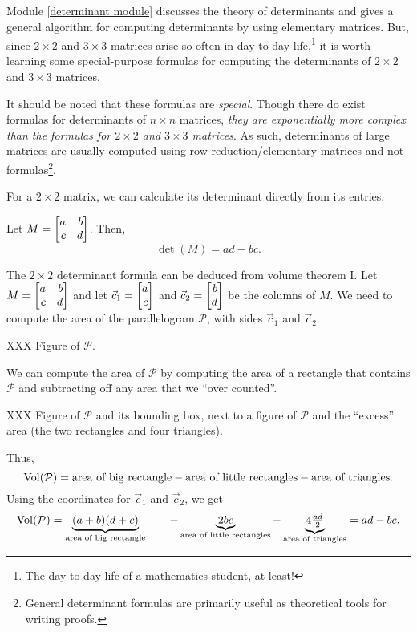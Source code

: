 Module \ref{determinant module} discusses the theory of determinants and gives a general algorithm
for computing determinants by using elementary matrices. But, since $2\times 2$ and $3\times 3$
matrices arise so often in day-to-day life,\footnote{ The day-to-day life of a mathematics student, at least!}
it is worth learning some special-purpose formulas for computing the determinants of $2\times 2$ and $3\times 3$
matrices.

It should be noted that these formulas are \emph{special}. Though there do exist
formulas for determinants of $n\times n$ matrices, \emph{they are exponentially more complex
than the formulas for $2\times 2$ and $3\times 3$ matrices}. As such, determinants of large matrices
are usually computed using row reduction/elementary matrices and not formulas\footnote{
	General determinant formulas are primarily useful as theoretical tools for writing proofs.}.


For a $2\times 2$ matrix, we can calculate its determinant directly from its entries.

\begin{theorem}
	Let $M=\mat{a & b \\ c & d}$. Then,
	\[
		\det(M)=ad-bc.
	\]
\end{theorem}

The $2\times 2$ determinant formula can be deduced from volume theorem I.
Let $M=\mat{a&b\\c&d}$ and let $\vec c_1=\mat{a\\c}$ and $\vec c_2=\mat{b\\d}$ be the columns of $M$.
We need to compute the area of the parallelogram $\mathcal P$, with sides $\vec c_1$ and $\vec c_2$.

XXX Figure of $\mathcal P$.


We can compute the area of $\mathcal P$ by computing the area of a rectangle that contains
$\mathcal P$ and subtracting off any area that we ``over counted''.

XXX Figure of $\mathcal P$ and its
bounding box, next to a figure of $\mathcal P$ and the ``excess'' area (the two rectangles and four triangles).

Thus,
\[
	\operatorname{Vol}(\mathcal P) = \text{area of big rectangle} - \text{area of little rectangles} - \text{area of triangles}.
\]
Using the coordinates for $\vec c_1$ and $\vec c_2$, we get
\begin{equation}
	\label{EQDETFORM}
	\operatorname{Vol}(\mathcal P) = \underbrace{(a+b)(d+c)}_{\text{area of big rectangle}} \qquad -
	\underbrace{2bc}_{\text{area of little rectangles}} -
	\underbrace{4\tfrac{ad}{2}}_{\text{area of triangles}} = ad-bc.
\end{equation}

